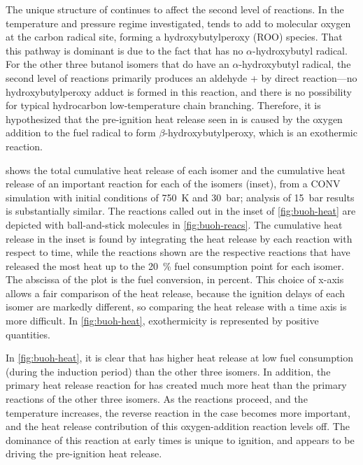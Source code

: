 \documentclass[../main.tex]{subfiles}
\begin{document}
The unique structure of \tBuOH{} continues to affect the second level
of reactions. In the temperature and pressure regime investigated,
\tBuOH{} tends to add to molecular oxygen at the carbon radical site,
forming a hydroxybutylperoxy (ROO) species. That this pathway is dominant is
due to the fact that \tBuOH{} has no $\alpha$-hydroxybutyl radical.
For the other three butanol isomers that do have an $\alpha$-hydroxybutyl
radical, the second level of reactions primarily produces an aldehyde + 
by direct reaction---no hydroxybutylperoxy adduct is formed in this reaction,
and there is no possibility for typical hydrocarbon low-temperature chain
branching. Therefore, it is hypothesized that the pre-ignition heat release
seen in \tBuOH{} is caused by the oxygen addition to the fuel radical
to form $\beta$-hydroxybutylperoxy, which is an exothermic reaction.

 shows the total cumulative heat release of each isomer
and the cumulative heat release of an important reaction for each of the
isomers (inset), from a CONV simulation with initial conditions of \SI{750}{\kelvin} and
\SI{30}{\bar}; analysis of \SI{15}{\bar} results is substantially similar. The
reactions called out in the inset of \cref{fig:buoh-heat} are depicted with
ball-and-stick molecules in \cref{fig:buoh-reacs}. The cumulative heat
release in the inset is found by integrating the heat release by each reaction
with respect to time, while the reactions shown are the respective reactions
that have released the most heat up to the \SI{20}{\percent} fuel consumption point for each
isomer. The abscissa of the plot is the fuel conversion, in percent. This
choice of x-axis allows a fair comparison of the heat release, because the
ignition delays of each isomer are markedly different, so comparing the heat
release with a time axis is more difficult. In \cref{fig:buoh-heat},
exothermicity is represented by positive quantities.

In \cref{fig:buoh-heat}, it is clear that \tBuOH{} has higher
heat release at low fuel consumption (during the induction period) than the
other three isomers. In addition, the primary heat release reaction for
\tBuOH{} has created much more heat than the primary reactions of the
other three isomers. As the reactions proceed, and the temperature increases,
the reverse reaction in the \tBuOH{} case becomes more important, and
the heat release contribution of this oxygen-addition reaction levels off. The
dominance of this reaction at early times is unique to \tBuOH{}
ignition, and appears to be driving the pre-ignition heat release.
\end{document}
